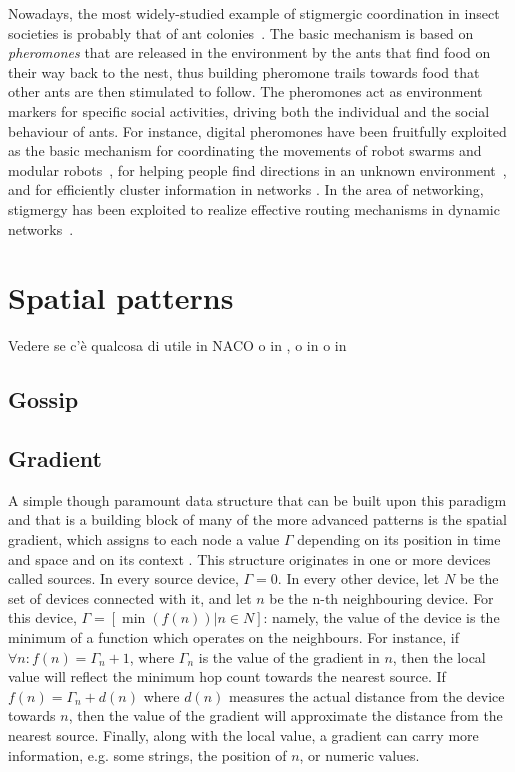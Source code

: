 \documentclass[12pt,a4paper,twoside,openright]{book}
\begin{document}
Nowadays, the most widely-studied example of stigmergic coordination in insect societies is probably that of ant colonies~\cite{dorigo-aco2004}.
%
The basic mechanism is based on \emph{pheromones} that are released in the environment by the ants that find food on their way back to the nest, thus building pheromone trails towards food that other ants are then stimulated to follow.
%
The pheromones act as environment markers for specific social activities, driving both the individual and the social behaviour of ants.
%
For instance, digital pheromones \cite{pheromoncoord-aamas2002,stigmergy-e4masII} have been fruitfully exploited as the basic mechanism for coordinating the movements of robot swarms and modular robots~\cite{tota-aamas2005}, for helping people find directions in an unknown environment~\cite{MameiZ07}, and for efficiently cluster information in networks \cite{collectivesort-scico74,wordNet}.
%
In the area of networking, stigmergy has been exploited to realize effective routing mechanisms in dynamic networks~\cite{swarmintelligence-book1999,AC-Survey}.

\section{Spatial patterns}

Vedere se c'è qualcosa di utile in NACO \cite{FDMVA-NACO2012} o in \cite{GVO-CEEMAS2007}, o in \cite{ecosystems-jpcc7} o in \cite{BabaogluPatterns}

\subsection{Gossip}


\subsection{Gradient}
\label{gradient}
A simple though paramount data structure that can be built upon this paradigm and that is a building block of many of the more advanced patterns is the spatial gradient, which assigns to each node a value $\varGamma$ depending on its position in time and space and on its context \cite{mamei2009acm,crf,VCMZ-TAAS2011}.
%
This structure originates in one or more devices called sources.
%
In every source device, $\varGamma=0$.
%
In every other device, let $N$ be the set of devices connected with it, and let $n$ be the n-th neighbouring device.
%
For this device, $\varGamma=[\min(f(n)) | n \in N]$: namely, the value of the device is the minimum of a function which operates on the neighbours.
%
For instance, if $ \forall n \colon f(n)=\varGamma_{n}+1$, where $\varGamma_{n}$ is the value of the gradient in $n$, then the local value will reflect the minimum hop count towards the nearest source.
%
If $f(n) = \varGamma_{n} +d(n)$ where $d(n)$ measures the actual distance from the device towards $n$, then the value of the gradient will approximate the distance from the nearest source.
%
Finally, along with the local value, a gradient can carry more information, e.g. some strings, the position of $n$, or numeric values.
\end{document}
